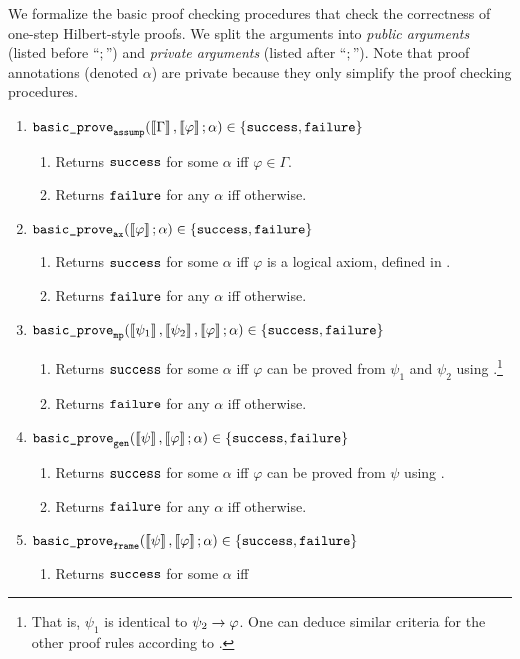 \documentclass{article}
\begin{document}
We formalize the basic proof checking procedures that check the correctness of one-step Hilbert-style proofs.
We split the arguments into \emph{public arguments} (listed before ``$;$'')
and \emph{private arguments} (listed after ``$;$''). 
Note that proof annotations (denoted $\alpha$) are private because they
only simplify the proof checking procedures.
\begin{enumerate}
\item $\bpassump(\enGamma , \envarphi ; \alpha) \in \{\cdsucc,\cdfail\}$
\begin{enumerate}
\item Returns $\cdsucc$ for some $\alpha$ iff $\varphi \in \Gamma$.
\item Returns $\cdfail$ for any $\alpha$ iff otherwise. 
\end{enumerate}
\item $\bpax(\envarphi ; \alpha) \in \{\cdsucc,\cdfail\}$
\begin{enumerate}
\item Returns $\cdsucc$ for some $\alpha$ iff $\varphi$ is a logical axiom, defined in .
\item Returns $\cdfail$ for any $\alpha$ iff otherwise. 
\end{enumerate}
\item $\bpmp(\enpsin{1}, \enpsin{2}, \envarphi ; \alpha) \in \{\cdsucc,\cdfail\}$
\begin{enumerate}
\item Returns $\cdsucc$ for some $\alpha$ iff
      $\varphi$ can be proved from $\psi_1$ and $\psi_2$ using \pruleMP.\footnote{That is, $\psi_1$ is identical to $\psi_2 \imp \varphi$. One can deduce similar criteria for the other proof rules according to .}
\item Returns $\cdfail$ for any $\alpha$ iff otherwise. 
\end{enumerate}
\item $\bpgen(\enpsi, \envarphi ; \alpha) \in \{\cdsucc,\cdfail\}$
\begin{enumerate}
\item Returns $\cdsucc$ for some $\alpha$ iff
      $\varphi$ can be proved from $\psi$ using \pruleG. 
\item Returns $\cdfail$ for any $\alpha$ iff otherwise.  
\end{enumerate}
\item $\bpframe(\enpsi, \envarphi ; \alpha) \in \{\cdsucc,\cdfail\}$
\begin{enumerate}
\item Returns $\cdsucc$ for some $\alpha$ iff

\end{enumerate}
\end{enumerate}
\end{document}
